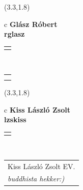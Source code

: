 \documentclass[11pt]{article}
\begin{document}
\makebox(3.3,1.8){
  \renewcommand\arraystretch{1.3}
  \begin{tabular}[c]{c}
    \hspace{8.5mm}
    \LARGE\bf{ Glász Róbert }\\
    \hspace{8.5mm}
    \Large{ rglasz }\\
    \renewcommand\arraystretch{3}
    \begin{tabular}[c]{c}
      \centering
      \fontfamily{phv}\selectfont{
        \textbf{
          \textsc{
            \scriptsize{
            \color{Dark}{ Ismerkedő }\color{Bright}{ Webmester }\color{Bright}{ Sminkmester }\color{Bright}{ Programozó }
            }
          }
        }
      }
    \end{tabular}
    \\
    \renewcommand\arraystretch{1}
    \begin{tabular}{p{3.3in}}
      \hspace{.7cm}\\
      \hspace{.7cm}\emph{  }\\
    \end{tabular}
  \end{tabular}
}

\makebox(3.3,1.8){
  \renewcommand\arraystretch{1.3}
  \begin{tabular}[c]{c}
    \hspace{8.5mm}
    \LARGE\bf{ Kiss László Zsolt }\\
    \hspace{8.5mm}
    \Large{ lzskiss }\\
    \renewcommand\arraystretch{3}
    \begin{tabular}[c]{c}
      \centering
      \fontfamily{phv}\selectfont{
        \textbf{
          \textsc{
            \scriptsize{
            \color{Bright}{ Ismerkedő }\color{Dark}{ Webmester }\color{Bright}{ Sminkmester }\color{Dark}{ Programozó }
            }
          }
        }
      }
    \end{tabular}
    \\
    \renewcommand\arraystretch{1}
    \begin{tabular}{p{3.3in}}
      \hspace{.7cm}Kiss László Zsolt EV.\\
      \hspace{.7cm}\emph{ buddhista hekker:) }\\
    \end{tabular}
  \end{tabular}
}
\end{document}
